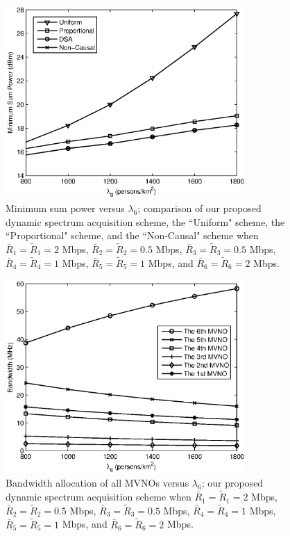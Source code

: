\documentclass[journal]{IEEEtran}
\begin{document}
\begin{figure}
\centering
\includegraphics[width=3.6in]{fig4.eps}
\caption{Minimum sum power versus $\lambda_6$; comparison of our proposed dynamic spectrum acquisition scheme, the ``Uniform" scheme, the ``Proportional" scheme, and the ``Non-Causal" scheme when $\bar{R}_1 =\tilde{R}_1=2$ Mbps, $\bar{R}_2 =\tilde{R}_2=0.5$ Mbps, $\bar{R}_3=\tilde{R}_3=0.5$ Mbps, $\bar{R}_4 =\tilde{R}_4=1$ Mbps, $\bar{R}_5=\tilde{R}_5=1$ Mbps, and $\bar{R}_6 =\tilde{R}_6=2$ Mbps.}
\end{figure}

\begin{figure}
\centering
\includegraphics[width=3.6in]{fig5.eps}
\caption{Bandwidth allocation of all MVNOs versus $\lambda_6$; our proposed dynamic spectrum acquisition scheme when $\bar{R}_1 =\tilde{R}_1=2$ Mbps, $\bar{R}_2 =\tilde{R}_2=0.5$ Mbps, $\bar{R}_3=\tilde{R}_3=0.5$ Mbps, $\bar{R}_4 =\tilde{R}_4=1$ Mbps, $\bar{R}_5=\tilde{R}_5=1$ Mbps, and $\bar{R}_6 =\tilde{R}_6=2$ Mbps.}
\end{figure}
\end{document}
